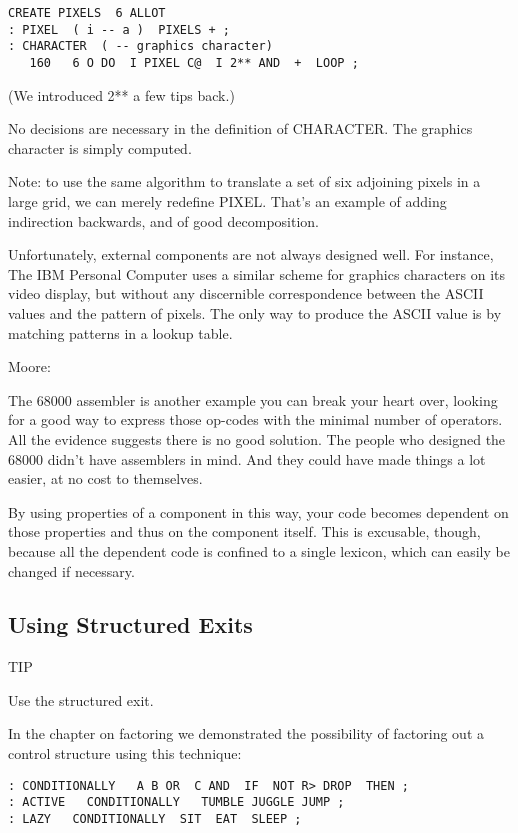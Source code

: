 \begin{verbatim}
CREATE PIXELS  6 ALLOT
: PIXEL  ( i -- a )  PIXELS + ;
: CHARACTER  ( -- graphics character)
   160   6 O DO  I PIXEL C@  I 2** AND  +  LOOP ;
\end{verbatim}

(We introduced 2** a few tips back.)

No decisions are necessary in the definition of CHARACTER. The
graphics character is simply computed.

Note: to use the same algorithm to translate a set of six adjoining
pixels in a large grid, we can merely redefine PIXEL. That's an example
of adding indirection backwards, and of good decomposition.

Unfortunately, external components are not always designed well.
For instance, The IBM Personal Computer uses a similar scheme for
graphics characters on its video display, but without any discernible
correspondence between the ASCII values and the pattern of pixels. The
only way to produce the ASCII value is by matching patterns in a lookup
table.

Moore:

The 68000 assembler is another example you can break your heart over,
looking for a good way to express those op-codes with the minimal number
of operators. All the evidence suggests there is no good solution. The people
who designed the 68000 didn't have assemblers in mind. And they could
have made things a lot easier, at no cost to themselves.

By using properties of a component in this way, your code becomes
dependent on those properties and thus on the component itself. This is
excusable, though, because all the dependent code is confined to a single
lexicon, which can easily be changed if necessary.

\subsection{Using Structured Exits}

TIP

Use the structured exit.

In the chapter on factoring we demonstrated the possibility of factoring
out a control structure using this technique:

\begin{verbatim}
: CONDITIONALLY   A B OR  C AND  IF  NOT R> DROP  THEN ;
: ACTIVE   CONDITIONALLY   TUMBLE JUGGLE JUMP ;
: LAZY   CONDITIONALLY  SIT  EAT  SLEEP ;
\end{verbatim}

